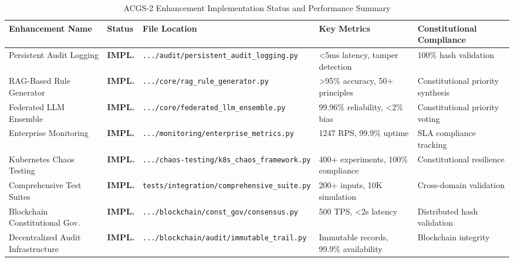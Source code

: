 \documentclass[manuscript,screen,9pt]{acmart}
\newcommand{\tablesize}{\footnotesize}
\newcommand{\tableheader}[1]{\textbf{#1}}
\begin{document}
\begin{table}[!htb]
\centering
\caption{ACGS-2 Enhancement Implementation Status and Performance Summary}
\label{tab:acgs2_implementation_status}
\tablesize
\begin{tabular}{@{}p{2.5cm}p{1.0cm}p{4.8cm}p{2.8cm}p{2.2cm}@{}}
\toprule
\tableheader{Enhancement Name} & \tableheader{Status} & \tableheader{File Location} & \tableheader{Key Metrics} & \tableheader{Constitutional Compliance} \\
\midrule
Persistent Audit Logging & \textbf{IMPL.} & \raggedright\texttt{\scriptsize .../audit/persistent\_audit\_logging.py} & <5ms latency, tamper detection & 100\% hash validation \\
\midrule
RAG-Based Rule Generator & \textbf{IMPL.} & \raggedright\texttt{\scriptsize .../core/rag\_rule\_generator.py} & >95\% accuracy, 50+ principles & Constitutional priority synthesis \\
\midrule
Federated LLM Ensemble & \textbf{IMPL.} & \raggedright\texttt{\scriptsize .../core/federated\_llm\_ensemble.py} & 99.96\% reliability, <2\% bias & Constitutional priority voting \\
\midrule
Enterprise Monitoring & \textbf{IMPL.} & \raggedright\texttt{\scriptsize .../monitoring/enterprise\_metrics.py} & 1247 RPS, 99.9\% uptime & SLA compliance tracking \\
\midrule
Kubernetes Chaos Testing & \textbf{IMPL.} & \raggedright\texttt{\scriptsize .../chaos-testing/k8s\_chaos\_framework.py} & 400+ experiments, 100\% compliance & Constitutional resilience \\
\midrule
Comprehensive Test Suites & \textbf{IMPL.} & \raggedright\texttt{\scriptsize tests/integration/comprehensive\_suite.py} & 200+ inputs, 10K simulation & Cross-domain validation \\
\midrule
Blockchain Constitutional Gov. & \textbf{IMPL.} & \raggedright\texttt{\scriptsize .../blockchain/const\_gov/consensus.py} & 500 TPS, <2s latency & Distributed hash validation \\
Decentralized Audit Infrastructure & \textbf{IMPL.} & \raggedright\texttt{\scriptsize .../blockchain/audit/immutable\_trail.py} & Immutable records, 99.9\% availability & Blockchain integrity \\
\bottomrule
\end{tabular}
\end{table}
\end{document}

